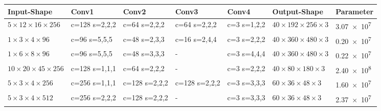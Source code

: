 \begin{table}
    \scriptsize
    \begin{tabularx}{\textwidth}{lXXXXll}
        \hline
        Input-Shape & Conv1 & Conv2 & Conv3 & Conv4 & Output-Shape & Parameter \\ \hline
        $5 \times 12 \times 16 \times 256$ & c=128 \newline s=2,2,2 & c=64 \newline s=2,2,2 & c=64 \newline s=2,2,2 & c=3 \newline s=1,2,2 & $40 \times 192 \times 256 \times 3$ & \num{3,07e7} \\ \hline

        $1 \times 3 \times 4 \times 96$ & c=96 \newline s=5,5,5 & c=48 \newline s=2,3,3 & c=16 \newline s=2,4,4 & c=3 \newline s=2,2,2 & $40 \times 360 \times 480 \times 3$ & \num{0,20e7} \\ \hline

        $1 \times 6 \times 8 \times 96$ & c=96 \newline s=5,5,5 & c=48 \newline s=3,3,3 & - & c=3 \newline s=4,4,4 & $40 \times 360 \times 480 \times 3$ & \num{0,22e7} \\ \hline

        $10 \times 20 \times 45 \times 256$ & c=128 \newline s=1,1,1 & c=64 \newline s=2,2,2 & - & c=3 \newline s=2,2,2 & $40 \times 80 \times 180 \times 3$ & \num{2,40e8} \\ \hline

        $5 \times 3 \times 4 \times 256$ & c=256 \newline s=1,1,1 & c=128 \newline s=2,2,2 & c=128 \newline s=2,2,2 & c=3 \newline s=3,3,3 & $60 \times 36 \times 48 \times 3$ & \num{1,60e7} \\ \hline

        $5 \times 3 \times 4 \times 512$ & c=256 \newline s=2,2,2 & c=128 \newline s=2,2,2 & - & c=3 \newline s=3,3,3 & $60 \times 36 \times 48 \times 3$ & \num{2,37e7} \\ \hline


\end{tabularx}
\end{table}
